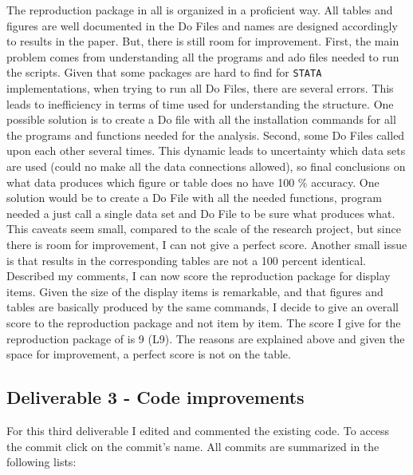 \documentclass{article}
\begin{document}
    \noindent The reproduction package in all is organized in a proficient way. All tables and figures are well documented in the Do Files and names are designed accordingly to results in the paper. But, there is still room for improvement. First, the main problem comes from understanding all the programs and ado files needed to run the scripts. Given that some packages are hard to find for \texttt{STATA} implementations, when trying to run all Do Files, there are several errors. This leads to inefficiency in terms of time used for understanding the structure. One possible solution is to create a Do file with all the installation commands for all the programs and functions needed for the analysis. Second, some Do Files called upon each other several times. This dynamic leads to uncertainty which data sets are used (could no make all the data connections allowed), so final conclusions on what data produces which figure or table does no have 100 \% accuracy. One solution would be to create a Do File with all the needed functions, program needed a just call a single data set and Do File to be sure what produces what. This caveats seem small, compared to the scale of the research project, but since there is room for improvement, I can not give a perfect score. Another small issue is that results in the corresponding tables are not a 100 percent identical. Described my comments, I can now score the reproduction package for display items. Given the size of the display items is remarkable, and that figures and tables are basically produced by the same commands, I decide to give an overall score to the reproduction package and not item by item. The score I give for the reproduction package of \cite{abebe2021anonymity} is 9 (L9). The reasons are explained above and given the space for improvement, a perfect score is not on the table.

    
    \subsection{Deliverable 3 - Code improvements} \label{DF Deliverable 3}


    For this third deliverable I edited and commented the existing code. To access the commit click on the commit's name. All commits are summarized in the following lists:
\end{document}
